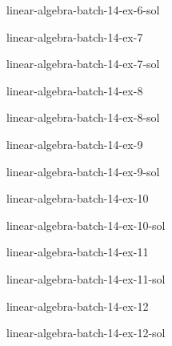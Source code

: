 \documentclass[preview]{standalone}
\begin{document}
\begin{snippetsolution}{linear-algebra-batch-14-ex-6-sol}{}
    \todo
\end{snippetsolution}

\begin{snippetexercise}{linear-algebra-batch-14-ex-7}{}
    \todo
\end{snippetexercise}

\begin{snippetsolution}{linear-algebra-batch-14-ex-7-sol}{}
    \todo
\end{snippetsolution}

\begin{snippetexercise}{linear-algebra-batch-14-ex-8}{}
    \todo
\end{snippetexercise}

\begin{snippetsolution}{linear-algebra-batch-14-ex-8-sol}{}
    \todo
\end{snippetsolution}

\begin{snippetexercise}{linear-algebra-batch-14-ex-9}{}
    \todo
\end{snippetexercise}

\begin{snippetsolution}{linear-algebra-batch-14-ex-9-sol}{}
    \todo
\end{snippetsolution}

\begin{snippetexercise}{linear-algebra-batch-14-ex-10}{}
    \todo
\end{snippetexercise}

\begin{snippetsolution}{linear-algebra-batch-14-ex-10-sol}{}
    \todo
\end{snippetsolution}

\begin{snippetexercise}{linear-algebra-batch-14-ex-11}{}
    \todo
\end{snippetexercise}

\begin{snippetsolution}{linear-algebra-batch-14-ex-11-sol}{}
    \todo
\end{snippetsolution}

\begin{snippetexercise}{linear-algebra-batch-14-ex-12}{}
    \todo
\end{snippetexercise}

\begin{snippetsolution}{linear-algebra-batch-14-ex-12-sol}{}
    \todo
\end{snippetsolution}
\end{document}

